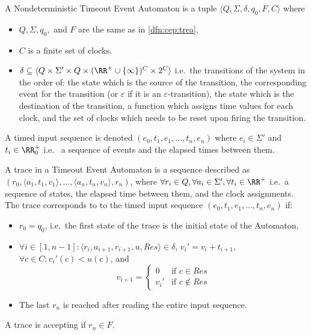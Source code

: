 				\begin{dfn}
					\label{dfn:cep:tea}
					A Nondeterministic Timeout Event Automaton is a tuple $\langle Q,\Sigma,\delta,q_0, F, C \rangle$ where
					\begin{itemize}
						\item $Q, \Sigma, q_0,$ and $F$ are the same as in \cref{dfn:cep:trea},	
						\item $C$ is a finite set of clocks.
						\item $\delta \subseteq \langle Q \times \Sigma' \times Q \times (\RR^+ \cup \{\infty\})^C \times 2^C \rangle$ i.e.~the transitions of the system in the order of:
							the state which is the source of the transition,
							the corresponding event for the transition (or $\varepsilon$ if it is an $\varepsilon$-transition),
							the state which is the destination of the transition,
							a function which assigns time values for each clock,
							and the set of clocks which needs to be reset upon firing the transition.
					\end{itemize}
				\end{dfn}
			
				\begin{dfn}
					\label{dfn:cep:tea:inputseq}
					A timed input sequence is denoted $(e_0, t_1, e_1, \dots, t_n, e_n)$ where $e_i \in \Sigma'$ and $t_i \in \RR^+_0$ i.e.~ a sequence of events and the elapsed times between them.
				\end{dfn}
			
				\begin{dfn}
				\label{dfn:cep:tea:trace}
				A trace in a Timeout Event Automaton is a sequence described as
				$(r_0, \langle a_1, t_1, v_1\rangle, \dots, \langle a_n, t_n, v_n \rangle, r_n)$, where $\forall r_i \in Q, \forall a_i \in \Sigma', \forall t_i \in \RR^+$ i.e.~a sequence of states, the elapsed time between them, and the clock assignments. The trace corresponds to to the timed input sequence $(e_0, t_1, e_1, \dots, t_n, e_n)$ if:
				\begin{itemize}
					\item $r_0 = q_0$, i.e.~the first state of the trace is the initial state of the Automaton,
					\item $\forall i \in [1,n - 1] \colon \langle r_i, a_{i+1}, r_{i+1}, u, \mathit{Res} \rangle \in \delta$,
						${v_i}' = v_i + t_{i+1}$, $\forall c \in C \colon {v_i}'(c) < u(c)$, and
						$$v_{i+1} = \begin{cases}
										0      & \text{if\ } c \in    \mathit{Res} \\
										{v_i}' & \text{if\ } c \notin \mathit{Res}
									\end{cases}$$
					\item The last $r_n$ is reached after reading the entire input sequence.	
				\end{itemize}
				A trace is accepting if $r_n \in F$.
				\end{dfn}
				
